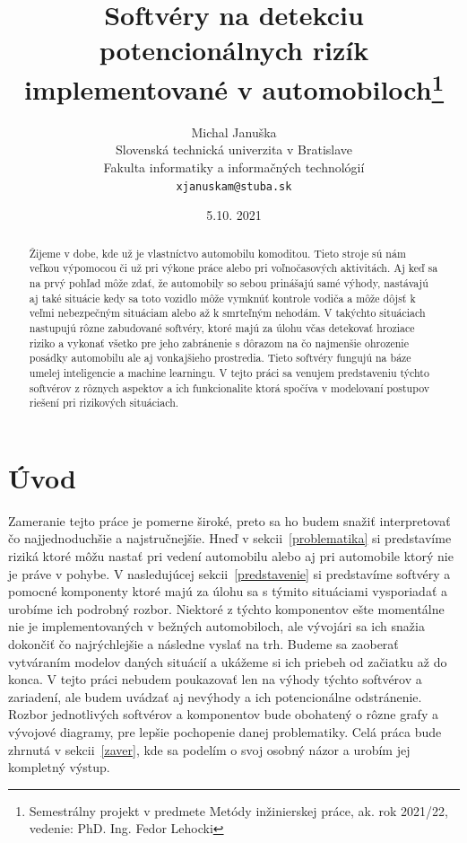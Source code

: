 \documentclass[10pt,twoside,slovak,a4paper]{article}
\title{Softvéry na detekciu potencionálnych rizík 
implementované v automobiloch\thanks{Semestrálny projekt v predmete Metódy inžinierskej práce, ak. rok 2021/22, vedenie: PhD. Ing. Fedor Lehocki  }}
\author{Michal Januška\\[2pt]
	{\small Slovenská technická univerzita v Bratislave}\\
	{\small Fakulta informatiky a informačných technológií}\\
	{\small \texttt{xjanuskam@stuba.sk}}
	}
\date{\small 5.10. 2021}
\begin{document}
\maketitle

\begin{abstract}
Žijeme v dobe, kde už je vlastníctvo automobilu komoditou. Tieto stroje sú nám veľkou výpomocou či už pri výkone práce alebo pri voľnočasových aktivitách. Aj keď sa na prvý pohľad môže zdať, že automobily so sebou prinášajú samé výhody, nastávajú aj také situácie kedy sa toto vozidlo môže vymknúť kontrole vodiča a môže dôjsť  k veľmi nebezpečným situáciam alebo až k smrteľným nehodám. V takýchto situáciach nastupujú rôzne zabudované softvéry, ktoré majú za úlohu včas detekovať hroziace riziko a vykonať všetko pre jeho zabránenie s dôrazom na čo najmenšie ohrozenie posádky automobilu ale aj vonkajšieho prostredia. Tieto softvéry fungujú na báze umelej inteligencie a machine learningu. V tejto práci sa venujem predstaveniu týchto softvérov z rôznych aspektov a ich funkcionalite ktorá spočíva v modelovaní postupov riešení pri rizikových situáciach.
\end{abstract}



\section{Úvod}\label{uvod}

Zameranie tejto práce je pomerne široké, preto sa ho budem snažiť interpretovať čo najjednoduchšie a najstručnejšie. Hneď v sekcii~\ref{problematika} si predstavíme riziká ktoré môžu nastať pri vedení automobilu alebo aj pri automobile ktorý nie je práve v pohybe. V nasledujúcej sekcii~\ref{predstavenie} si predstavíme softvéry a pomocné komponenty ktoré majú za úlohu sa s týmito situáciami vysporiadať a urobíme ich podrobný rozbor. Niektoré z týchto komponentov ešte momentálne nie je implementovaných v bežných automobiloch, ale vývojári sa ich snažia dokončiť čo najrýchlejšie a následne vyslať na trh. Budeme sa zaoberať vytváraním modelov daných situácií a ukážeme si ich priebeh od začiatku až do konca. V tejto práci nebudem poukazovať len na výhody týchto softvérov a zariadení, ale budem uvádzať aj nevýhody a ich potencionálne odstránenie. Rozbor jednotlivých softvérov a komponentov bude obohatený o rôzne grafy a vývojové diagramy, pre lepšie pochopenie danej problematiky. Celá práca bude zhrnutá v sekcii~\ref{zaver}, kde sa podelím o svoj osobný názor a urobím jej kompletný výstup.
\end{document}
